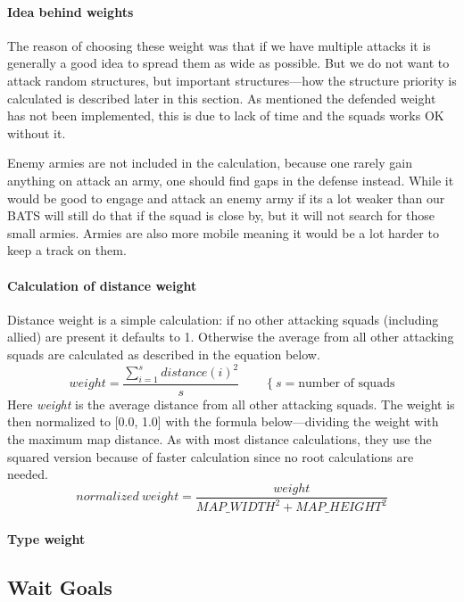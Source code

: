 \paragraph{Idea behind weights}
The reason of choosing these weight was that if we have multiple attacks it is generally a good idea to spread them as wide as possible. But we do not want to attack random structures, but important structures—how the structure priority is calculated is described later in this section. As mentioned the defended weight has not been implemented, this is due to lack of time and the squads works OK without it.

Enemy armies are not included in the calculation, because one rarely gain anything on attack an army, one should find gaps in the defense instead\cite{day9}. While it would be good to engage and attack an enemy army if its a lot weaker than our BATS will still do that if the squad is close by, but it will not search for those small armies. Armies are also more mobile meaning it would be a lot harder to keep a track on them.

\paragraph{Calculation of distance weight}
Distance weight is a simple calculation: if no other attacking squads (including allied) are present it defaults to 1. Otherwise the average from all other attacking squads are calculated as described in the equation below.
\[
\label{eq:distance_weight}
weight = \frac{\sum_{i=1}^{s}{distance(i)^2}}{s} \qquad \left\{s = \text{number of squads}\right.
\]
Here \emph{weight} is the average distance from all other attacking squads. The weight is then normalized to [0.0, 1.0] with the formula below—dividing the weight with the maximum map distance. As with most distance calculations, they use the squared version because of faster calculation since no root calculations are needed.
\[
normalized\ weight = \frac{weight}{MAP\_WIDTH^2 + MAP\_HEIGHT^2}
\]

\paragraph{Type weight}

\subsection{Wait Goals}